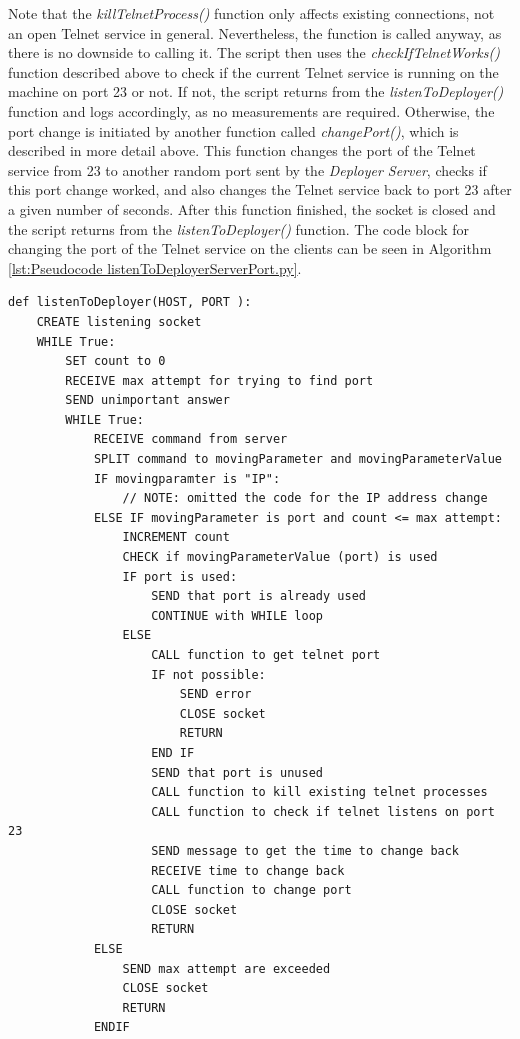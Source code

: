 Note that the \textit{killTelnetProcess()} function only affects existing connections, not an open Telnet service in general. Nevertheless, the function is called anyway, as there is no downside to calling it. The script then uses the \textit{checkIfTelnetWorks()} function described above to check if the current Telnet service is running on the machine on port 23 or not. If not, the script returns from the \textit{listenToDeployer()} function and logs accordingly, as no measurements are required. Otherwise, the port change is initiated by another function called \textit{changePort()}, which is described in more detail above. This function changes the port of the Telnet service from 23 to another random port sent by the \textit{Deployer Server}, checks if this port change worked, and also changes the Telnet service back to port 23 after a given number of seconds. After this function finished, the socket is closed and the script returns from the \textit{listenToDeployer()} function. The code block for changing the port of the Telnet service on the clients can be seen in Algorithm \ref{lst:Pseudocode listenToDeployerServerPort.py}.
\\





\begin{lstlisting}[caption={The Code Block for Changing the Port of the Telnet Service of a Client From the \textit{listenToDeployer()} Function in Pseudocode. Everything Related to the IP Address Change has Been Ommited Here.},label={lst:Pseudocode listenToDeployerServerPort.py}]
def listenToDeployer(HOST, PORT ):
    CREATE listening socket
    WHILE True:
        SET count to 0
        RECEIVE max attempt for trying to find port
        SEND unimportant answer
        WHILE True:
            RECEIVE command from server
            SPLIT command to movingParameter and movingParameterValue
            IF movingparamter is "IP":
                // NOTE: omitted the code for the IP address change
            ELSE IF movingParameter is port and count <= max attempt:
                INCREMENT count
                CHECK if movingParameterValue (port) is used
                IF port is used:
                    SEND that port is already used
                    CONTINUE with WHILE loop
                ELSE
                    CALL function to get telnet port
                    IF not possible:
                        SEND error
                        CLOSE socket
                        RETURN
                    END IF
                    SEND that port is unused
                    CALL function to kill existing telnet processes
                    CALL function to check if telnet listens on port 23
                    SEND message to get the time to change back
                    RECEIVE time to change back
                    CALL function to change port
                    CLOSE socket
                    RETURN
            ELSE
                SEND max attempt are exceeded
                CLOSE socket
                RETURN
            ENDIF
            
\end{lstlisting}





